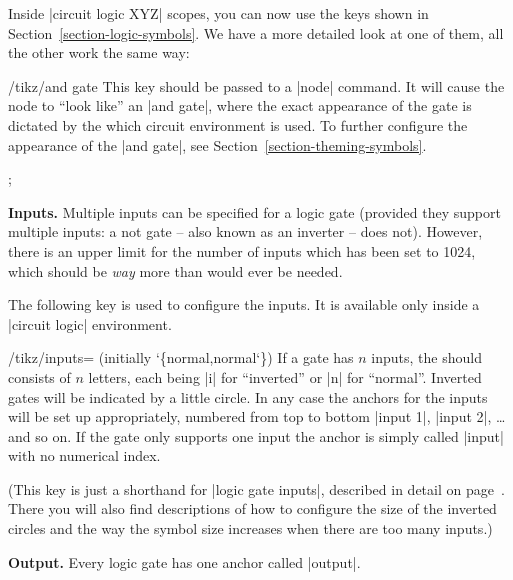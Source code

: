 Inside |circuit logic XYZ| scopes, you can now use the keys shown in
Section~\ref{section-logic-symbols}. We have a more detailed look at one of
them, all the other work the same way:

\begin{key}{/tikz/and gate}
    This key should be passed to a |node| command. It will cause the node to
    ``look like'' an |and gate|, where the exact appearance of the gate is
    dictated by the which circuit environment is used. To further configure the
    appearance of the |and gate|, see Section~\ref{section-theming-symbols}.
\begin{codeexample}[preamble={\usetikzlibrary{circuits.logic.IEC}}]
 ;
\end{codeexample}
\begin{codeexample}[preamble={\usetikzlibrary{circuits.logic.US}}]
\end{codeexample}

    \medskip\textbf{Inputs.}
    Multiple inputs can be specified for a logic gate (provided they support
    multiple inputs: a not gate -- also known as an inverter -- does not).
    However, there is an upper limit for the number of inputs which has been
    set to 1024, which should be \emph{way} more than would ever be needed.

    The following key is used to configure the inputs. It is available only
    inside a |circuit logic| environment.

    \begin{key}{/tikz/inputs= (initially \char`\{normal,normal\char`\})}
        If a gate has $n$ inputs, the  should consists of $n$
        letters, each being |i| for ``inverted'' or |n| for ``normal''.
        Inverted gates will be indicated by a little circle. In any case the
        anchors for the inputs will be set up appropriately, numbered from top
        to bottom |input 1|, |input 2|, \ldots and so on. If the gate only
        supports one input the anchor is simply called |input| with no
        numerical index.
\begin{codeexample}[preamble={\usetikzlibrary{circuits.logic.IEC}}]
\end{codeexample}
    \end{key}

    (This key is just a shorthand for |logic gate inputs|, described in detail
    on page~\pageref{logic-gate-inputs}. There you will also find descriptions
    of how to configure the size of the inverted circles and the way the symbol
    size increases when there are too many inputs.)

    \textbf{Output.}
    Every logic gate has one anchor called |output|.
\end{key}


